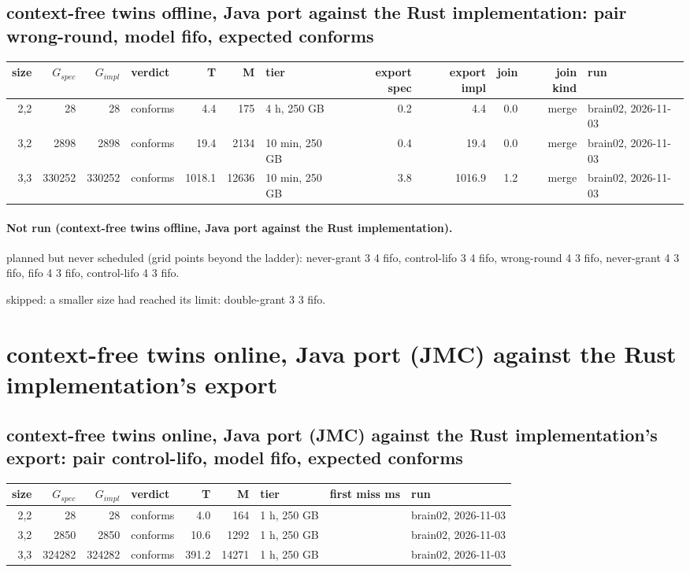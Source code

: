 \documentclass[10pt]{article}
\begin{document}
\subsection*{context-free twins offline, Java port against the Rust implementation: pair \textsf{wrong-round}, model fifo, expected conforms}
\begin{longtable}{@{}rrrlrrlrrrrl@{}}
\toprule
size & $G_{\mathit{spec}}$ & $G_{\mathit{impl}}$ & verdict & T & M & tier & export spec & export impl & join & join kind & run \\
\midrule
\endhead
\color{blue} 2,2 & 28 & 28 & conforms & 4.4 & 175 & 4 h, 250 GB & 0.2 & 4.4 & 0.0 & merge & brain02, 2026-11-03 \\
\color{blue} 3,2 & 2898 & 2898 & conforms & 19.4 & 2134 & 10 min, 250 GB & 0.4 & 19.4 & 0.0 & merge & brain02, 2026-11-03 \\
\color{blue} 3,3 & 330252 & 330252 & conforms & 1018.1 & 12636 & 10 min, 250 GB & 3.8 & 1016.9 & 1.2 & merge & brain02, 2026-11-03 \\
\bottomrule
\end{longtable}
\paragraph{Not run (context-free twins offline, Java port against the Rust implementation).}
planned but never scheduled (grid points beyond the ladder): never-grant 3 4 fifo, control-lifo 3 4 fifo, wrong-round 4 3 fifo, never-grant 4 3 fifo, fifo 4 3 fifo, control-lifo 4 3 fifo.\par
skipped: a smaller size had reached its limit: double-grant 3 3 fifo.\par
\section*{context-free twins online, Java port (JMC) against the Rust implementation's export}
\subsection*{context-free twins online, Java port (JMC) against the Rust implementation's export: pair \textsf{control-lifo}, model fifo, expected conforms}
\begin{longtable}{@{}rrrlrrlrl@{}}
\toprule
size & $G_{\mathit{spec}}$ & $G_{\mathit{impl}}$ & verdict & T & M & tier & first miss ms & run \\
\midrule
\endhead
\color{red} 2,2 & 28 & 28 & conforms & 4.0 & 164 & 1 h, 250 GB &  & brain02, 2026-11-03 \\
\color{blue} 3,2 & 2850 & 2850 & conforms & 10.6 & 1292 & 1 h, 250 GB &  & brain02, 2026-11-03 \\
\color{blue} 3,3 & 324282 & 324282 & conforms & 391.2 & 14271 & 1 h, 250 GB &  & brain02, 2026-11-03 \\
\bottomrule
\end{longtable}
\end{document}
